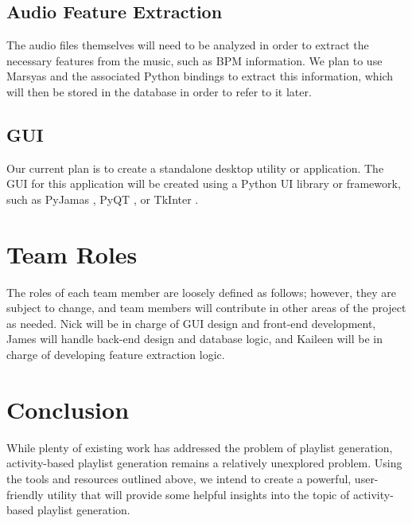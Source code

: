 \documentclass{article}
\begin{document}
\subsection{Audio Feature Extraction}
The audio files themselves will need to be analyzed in order to extract the necessary features from the music, such as BPM information. We plan to use Marsyas and the associated Python bindings to extract this information, which will then be stored in the database in order to refer to it later.

\subsection{GUI}
Our current plan is to create a standalone desktop utility or application. The GUI for this application will be created using a Python UI library or framework, such as PyJamas \cite{Pyjs}, PyQT \cite{PyQT}, or TkInter \cite{TkInter}.

\section{Team Roles}
The roles of each team member are loosely defined as follows; however, they are subject to change, and team members will contribute in other areas of the project as needed. Nick will be in charge of GUI design and front-end development, James will handle back-end design and database logic, and Kaileen will be in charge of developing feature extraction logic.

\section{Conclusion}
While plenty of existing work has addressed the problem of playlist generation, activity-based playlist generation remains a relatively unexplored problem. Using the tools and resources outlined above, we intend to create a powerful, user-friendly utility that will provide some helpful insights into the topic of activity-based playlist generation.
\end{document}
